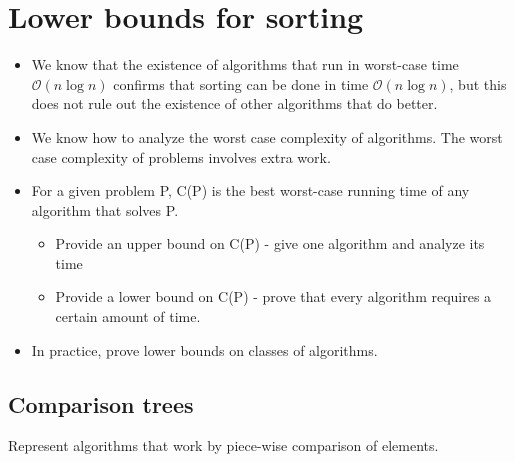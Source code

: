 \documentclass[11pt]{article}
\begin{document}
\section{Lower bounds for sorting}
\begin{itemize}
    \item We know that the existence of algorithms that run in worst-case time $\mathcal{O}(n \log n)$ confirms that sorting can be done in time $\mathcal{O}(n \log n)$, but this does not rule out the existence of other algorithms that do better. 
    
    \item We know how to analyze the worst case complexity of algorithms. The worst case complexity of problems involves extra work. 
    
    \item For a given problem P, C(P) is the best worst-case running time of any algorithm that solves P. 
    \begin{itemize}
        \item Provide an upper bound on C(P) - give one algorithm and analyze its time
        
        \item Provide a lower bound on C(P) - prove that every algorithm requires a certain amount of time. 
    \end{itemize}
    
    \item In practice, prove lower bounds on classes of algorithms.
\end{itemize}

\subsection{Comparison trees}
Represent algorithms that work by piece-wise comparison of elements. 
\end{document}
